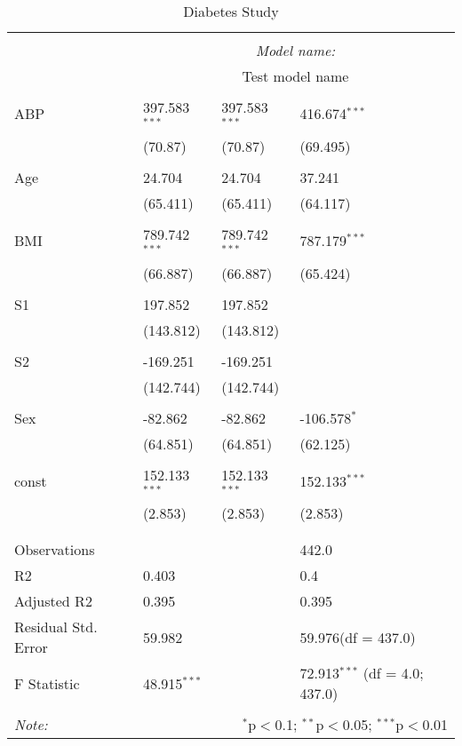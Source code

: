 \documentclass[12pt]{article}
\numberwithin{equation}{subsection}
\begin{document}
\begin{table}[!htbp] \centering
  \caption{Diabetes Study}
  \label{}
\begin{tabularx}{\textwidth}{lXXX}
\\[-1.8ex]\hline
\hline \\[-1.8ex]
& \multicolumn{3}{c}{\textit{Model name:}} \
\cr \cline{3-4}
\\[-1.8ex] & \multicolumn{3}{c}{Test model name} \\\hline \\[-1.8ex]
 ABP & 397.583$^{***}$ & 397.583$^{***}$ & 416.674$^{***}$ \\
  & (70.87) & (70.87) & (69.495) \\
  & & & \\
 Age & 24.704$^{}$ & 24.704$^{}$ & 37.241$^{}$ \\
  & (65.411) & (65.411) & (64.117) \\
  & & & \\
 BMI & 789.742$^{***}$ & 789.742$^{***}$ & 787.179$^{***}$ \\
  & (66.887) & (66.887) & (65.424) \\
  & & & \\
 S1 & 197.852$^{}$ & 197.852$^{}$ & \\
  & (143.812) & (143.812) & \\
  & & & \\
 S2 & -169.251$^{}$ & -169.251$^{}$ & \\
  & (142.744) & (142.744) & \\
  & & & \\
 Sex & -82.862$^{}$ & -82.862$^{}$ & -106.578$^{*}$ \\
  & (64.851) & (64.851) & (62.125) \\
  & & & \\
 const & 152.133$^{***}$ & 152.133$^{***}$ & 152.133$^{***}$ \\
  & (2.853) & (2.853) & (2.853) \\
  & & & \\
\hline \\[-1.8ex]
 Observations &   &   & 442.0 \\
 R${2}$ & 0.403 &   & 0.4 \\
 Adjusted R${2}$ & 0.395 &   & 0.395 \\
 Residual Std. Error & 59.982 &   & 59.976(df = 437.0)  \\
 F Statistic & 48.915$^{***}$  &     & 72.913$^{***}$ (df = 4.0; 437.0) \\
\hline
\hline \\[-1.8ex]
\textit{Note:} & \multicolumn{3}{r}{$^{*}$p$<$0.1; $^{**}$p$<$0.05; $^{***}$p$<$0.01} \\
\end{tabularx}
\end{table}
\end{document}
